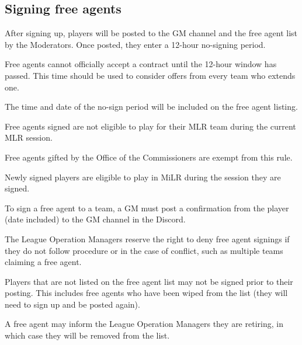 \subsection{Signing free agents}
\begin{deepEnumerate}
	\item After signing up, players will be posted to the GM channel and the free agent list by the Moderators. Once posted, they enter a 12-hour no-signing period.
	\begin{deepEnumerate}
		\item Free agents cannot officially accept a contract until the 12-hour window has passed.
		This time should be used to consider offers from every team who extends one.
		\item The time and date of the no-sign period will be included on the free agent listing.
	\end{deepEnumerate}
	\item Free agents signed are not eligible to play for their MLR team during the current MLR session.
	\begin{deepEnumerate}
		\item Free agents gifted by the Office of the Commissioners are exempt from this rule.
		\item Newly signed players are eligible to play in MiLR during the session they are signed.
	\end{deepEnumerate}
	\item To sign a free agent to a team, a GM must post a confirmation from the player	(date included) to the GM channel in the Discord.
	\item The League Operation Managers reserve the right to deny free agent signings if they do not follow procedure or in the case of conflict,
	such as multiple teams claiming a free agent.
	\item Players that are not listed on the free agent list may not be signed prior to their posting.
	This includes free agents who have been wiped from the list	(they will need to sign up and be posted again).
	\item A free agent may inform the League Operation Managers they are retiring, in which case they will be removed from the list.
\end{deepEnumerate}

